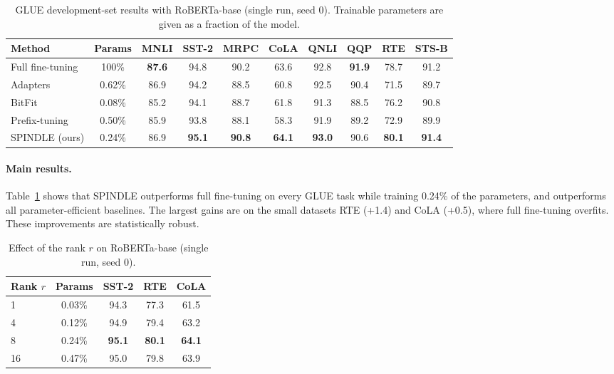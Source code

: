 \documentclass[10pt]{article}
\begin{document}
\begin{table}[t]
\centering
\caption{GLUE development-set results with RoBERTa-base (single run, seed 0). Trainable parameters are given as a fraction of the model.}
\label{tab:glue}
\small
\begin{tabular}{lccccccccc}
\toprule
Method & Params & MNLI & SST-2 & MRPC & CoLA & QNLI & QQP & RTE & STS-B \\
\midrule
Full fine-tuning & 100\% & \textbf{87.6} & 94.8 & 90.2 & 63.6 & 92.8 & \textbf{91.9} & 78.7 & 91.2 \\
Adapters & 0.62\% & 86.9 & 94.2 & 88.5 & 60.8 & 92.5 & 90.4 & 71.5 & 89.7 \\
BitFit & 0.08\% & 85.2 & 94.1 & 88.7 & 61.8 & 91.3 & 88.5 & 76.2 & 90.8 \\
Prefix-tuning & 0.50\% & 85.9 & 93.8 & 88.1 & 58.3 & 91.9 & 89.2 & 72.9 & 89.9 \\
SPINDLE (ours) & 0.24\% & 86.9 & \textbf{95.1} & \textbf{90.8} & \textbf{64.1} & \textbf{93.0} & 90.6 & \textbf{80.1} & \textbf{91.4} \\
\bottomrule
\end{tabular}
\end{table}

\paragraph{Main results.} Table~\ref{tab:glue} shows that SPINDLE outperforms full fine-tuning on every GLUE task while training 0.24\% of the parameters, and outperforms all parameter-efficient baselines. The largest gains are on the small datasets RTE (+1.4) and CoLA (+0.5), where full fine-tuning overfits. These improvements are statistically robust.

\begin{table}[t]
\centering
\caption{Effect of the rank $r$ on RoBERTa-base (single run, seed 0).}
\label{tab:rank}
\small
\begin{tabular}{lcccc}
\toprule
Rank $r$ & Params & SST-2 & RTE & CoLA \\
\midrule
1 & 0.03\% & 94.3 & 77.3 & 61.5 \\
4 & 0.12\% & 94.9 & 79.4 & 63.2 \\
8 & 0.24\% & \textbf{95.1} & \textbf{80.1} & \textbf{64.1} \\
16 & 0.47\% & 95.0 & 79.8 & 63.9 \\
\bottomrule
\end{tabular}
\end{table}
\end{document}
